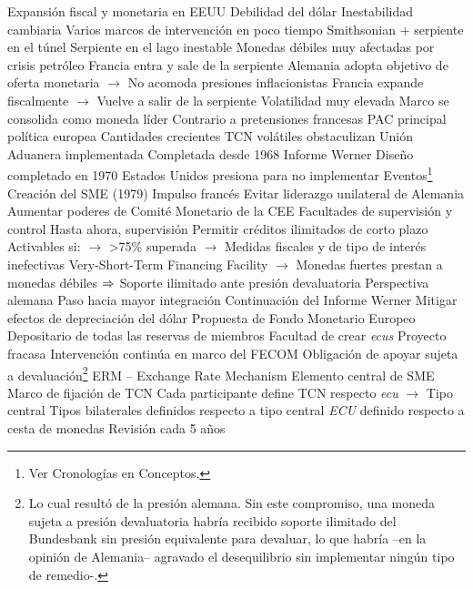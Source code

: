 \documentclass{nuevotema}
\begin{document}
\begin{esquemal}
				\4 Expansión fiscal y monetaria en EEUU
				\4[] Debilidad del dólar
			\3 Inestabilidad cambiaria
				\4 Varios marcos de intervención en poco tiempo
				\4 Smithsonian + serpiente en el túnel
				\4 Serpiente en el lago inestable
				\4[] Monedas débiles muy afectadas por crisis petróleo
				\4[] Francia entra y sale de la serpiente
				\4[] Alemania adopta objetivo de oferta monetaria
				\4[] $\to$ No acomoda presiones inflacionistas
				\4[] Francia expande fiscalmente
				\4[] $\to$ Vuelve a salir de la serpiente
				\4 Volatilidad muy elevada
				\4 Marco se consolida como moneda líder
				\4[] Contrario a pretensiones francesas
			\3 PAC principal política europea
				\4 Cantidades crecientes
				\4 TCN volátiles obstaculizan
			\3 Unión Aduanera implementada
				\4 Completada desde 1968
			\3 Informe Werner
				\4 Diseño completado en 1970
				\4 Estados Unidos presiona para no implementar
		\2 Eventos\footnote{Ver Cronologías en Conceptos.}
			\3 Creación del SME (1979)
				\4 Impulso francés
				\4[] Evitar liderazgo unilateral de Alemania
				\4 Aumentar poderes de Comité Monetario de la CEE
				\4[] Facultades de supervisión y control
				\4[] Hasta ahora, supervisión
				\4 Permitir créditos ilimitados de corto plazo
				\4[] Activables si:
				\4[] $\to$ >75\% superada
				\4[] $\to$ Medidas fiscales y de tipo de interés inefectivas
				\4[] Very-Short-Term Financing Facility
				\4[] $\to$ Monedas fuertes prestan a monedas débiles
				\4[] $\then$ Soporte ilimitado ante presión devaluatoria
				\4 Perspectiva alemana
				\4[] Paso hacia mayor integración
				\4[] Continuación del Informe Werner
				\4[] Mitigar efectos de depreciación del dólar
				\4 Propuesta de Fondo Monetario Europeo
				\4[] Depositario de todas las reservas de miembros
				\4[] Facultad de crear \textit{ecus}
				\4[$\then$] Proyecto fracasa
				\4[$\then$] Intervención continúa en marco del FECOM
				\4[$\then$] Obligación de apoyar sujeta a devaluación\footnote{Lo cual resultó de la presión alemana. Sin este compromiso, una moneda sujeta a presión devaluatoria habría recibido soporte ilimitado del Bundesbank sin presión equivalente para devaluar, lo que habría --en la opinión de Alemania-- agravado el desequilibrio sin implementar ningún tipo de remedio-.}
			\3 ERM -- Exchange Rate Mechanism
				\4 Elemento central de SME
				\4 Marco de fijación de TCN
				\4[] Cada participante define TCN respecto \textit{ecu}
				\4[] $\to$ Tipo central
				\4[] Tipos bilaterales definidos respecto a tipo central
				\4 \textit{ECU} definido respecto a cesta de monedas
				\4[] Revisión cada 5 años

\end{esquemal}
\end{document}
